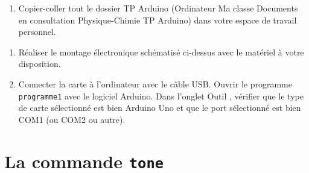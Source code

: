 \documentclass[12pt,a4paper]{article}
\begin{document}
\begin{enumerate}
\item \rea{}

Copier-coller tout le dossier \og TP Arduino \fg{} (Ordinateur \textrightarrow{} Ma classe \textrightarrow{} Documents en consultation \textrightarrow{} Physique-Chimie \textrightarrow{} TP Arduino) dans votre espace de travail personnel.
\end{enumerate}

\begin{enumerate}[resume]
\item \rea{}

Réaliser le montage électronique schématisé ci-dessus avec le matériel à votre disposition.

\item \rea{}

Connecter la carte à l'ordinateur avec le câble USB.
Ouvrir le programme \texttt{programme1} avec le logiciel Arduino.
Dans l'onglet \og Outil \fg{}, vérifier que le type de carte sélectionné est bien Arduino Uno et que le port sélectionné est bien COM1 (ou COM2 ou autre).
\end{enumerate}

\section*{La commande \texttt{tone}}
\end{document}
